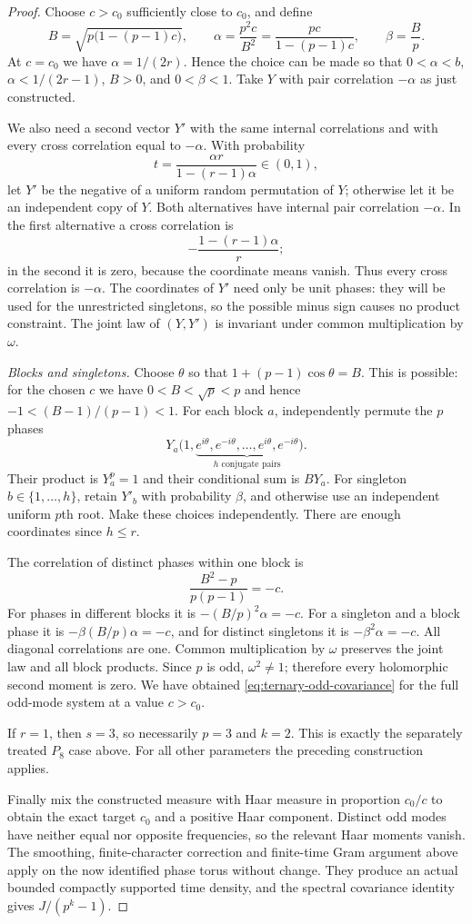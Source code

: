 \documentclass[11pt,a4paper]{article}
\theoremstyle{definition}\newtheorem{definition}[theorem]{Definition}
\theoremstyle{remark}\newtheorem{remark}[theorem]{Remark}
\begin{document}
\begin{proof}
Choose $c>c_0$ sufficiently close to $c_0$, and define
\[
 B=\sqrt{p\bigl(1-(p-1)c\bigr)},\qquad
 \alpha=\frac{p^2c}{B^2}=\frac{pc}{1-(p-1)c},\qquad
 \beta=\frac Bp.
\]
At $c=c_0$ we have $\alpha=1/(2r)$. Hence the choice can be made so
that $0<\alpha<b$, $\alpha<1/(2r-1)$, $B>0$, and $0<\beta<1$.
Take $Y$ with pair correlation $-\alpha$ as just constructed.

We also need a second vector $Y'$ with the same internal correlations
and with every cross correlation equal to $-\alpha$. With probability
\[
 t=\frac{\alpha r}{1-(r-1)\alpha}\in(0,1),
\]
let $Y'$ be the negative of a uniform random permutation of $Y$;
otherwise let it be an independent copy of $Y$. Both alternatives
have internal pair correlation $-\alpha$. In the first alternative a
cross correlation is
\[
 -\frac{1-(r-1)\alpha}{r};
\]
in the second it is zero, because the coordinate means vanish.
Thus every cross correlation is $-\alpha$. The coordinates of $Y'$
need only be unit phases: they will be used for the unrestricted
singletons, so the possible minus sign causes no product constraint.
The joint law of $(Y,Y')$ is invariant under common multiplication
by $\omega$.

\emph{Blocks and singletons.}
Choose $\theta$ so that $1+(p-1)\cos\theta=B$. This is possible:
for the chosen $c$ we have $0<B<\sqrt p<p$ and hence
$-1<(B-1)/(p-1)<1$. For each block $a$, independently permute
the $p$ phases
\[
 Y_a\bigl(1,
 \underbrace{e^{i\theta},e^{-i\theta},\ldots,
 e^{i\theta},e^{-i\theta}}_{h\text{ conjugate pairs}}\bigr).
\]
Their product is $Y_a^p=1$ and their conditional sum is $BY_a$.
For singleton $b\in\{1,\ldots,h\}$, retain $Y'_b$ with
probability $\beta$, and otherwise use an independent uniform
$p$th root. Make these choices independently. There are enough
coordinates since $h\le r$.

The correlation of distinct phases within one block is
\[
 \frac{B^2-p}{p(p-1)}=-c.
\]
For phases in different blocks it is
$-(B/p)^2\alpha=-c$. For a singleton and a block phase it is
$-\beta(B/p)\alpha=-c$, and for distinct singletons it is
$-\beta^2\alpha=-c$. All diagonal correlations are one.
Common multiplication by $\omega$ preserves the joint law and
all block products. Since $p$ is odd, $\omega^2\ne1$; therefore
every holomorphic second moment is zero. We have obtained
\eqref{eq:ternary-odd-covariance} for the full odd-mode system
at a value $c>c_0$.

If $r=1$, then $s=3$, so necessarily $p=3$ and $k=2$.
This is exactly the separately treated $P_8$ case above.
For all other parameters the preceding construction applies.

Finally mix the constructed measure with Haar measure in proportion
$c_0/c$ to obtain the exact target $c_0$ and a positive Haar
component. Distinct odd modes have neither equal nor opposite
frequencies, so the relevant Haar moments vanish. The smoothing,
finite-character correction and finite-time Gram argument above
apply on the now identified phase torus without change. They produce
an actual bounded compactly supported time density, and the
spectral covariance identity gives $J/(p^k-1)$.
\end{proof}
\end{document}
